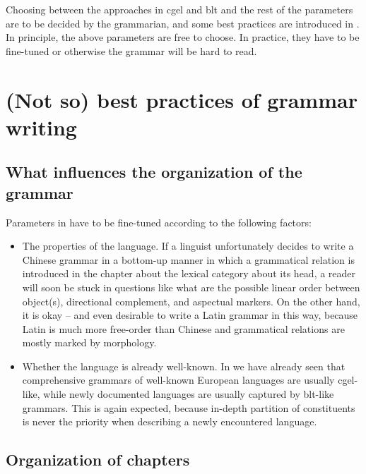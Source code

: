 \documentclass{article}
\begin{document}
Choosing between the approaches in \ac{cgel} and \ac{blt} 
and the rest of the parameters are to be decided by the grammarian,
and some best practices are introduced in .
In principle, the above parameters are free to choose.
In practice, they have to be fine-tuned or otherwise the grammar will be hard to read.

\section{(Not so) best practices of grammar writing}\label{sec:best-practice}

\subsection{What influences the organization of the grammar}

Parameters in  have to be fine-tuned according to the following factors:
\begin{itemize}
    \item The properties of the language. 
    If a linguist unfortunately decides to write a Chinese grammar 
    in a bottom-up manner
    in which a grammatical relation is introduced in the chapter about the lexical category about its head,
    a reader will soon be stuck in questions like 
    what are the possible linear order between object(s), directional complement, and aspectual markers.
    On the other hand, it is okay -- and even desirable to write a Latin grammar in this way,
    because Latin is much more free-order than Chinese 
    and grammatical relations are mostly marked by morphology.
    \item Whether the language is already well-known. 
    In  we have already seen that
    comprehensive grammars of well-known European languages are usually \ac{cgel}-like,
    while newly documented languages are usually captured by \ac{blt}-like grammars.
    This is again expected, because in-depth partition of constituents 
    is never the priority when describing a newly encountered language.
\end{itemize}


\subsection{Organization of chapters}
\end{document}

